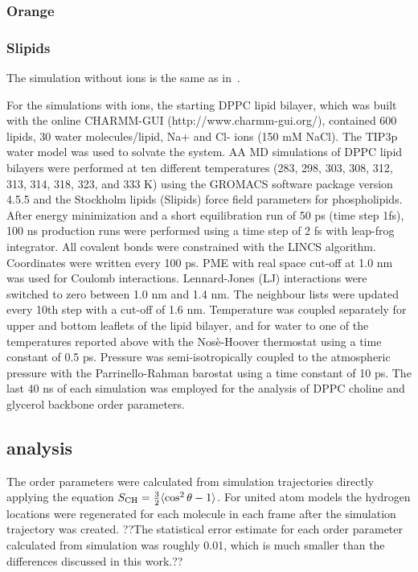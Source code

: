 \documentclass[pre,aps,floatfix,authordate1-4,twocolumn]{revtex4-1}
\begin{document}
\subsubsection{Orange}

\subsubsection{Slipids}
The simulation without ions is the same as in~\cite{botan15}.

For the simulations with ions, the starting DPPC lipid bilayer, which was built with the online CHARMM-GUI
(http://www.charmm-gui.org/), contained 600 lipids, 30 water molecules/lipid, Na+ and Cl- ions (150 mM NaCl). 
The TIP3p water model was used to solvate the system. AA MD simulations of DPPC lipid bilayers were performed 
at ten different temperatures (283, 298, 303, 308, 312, 313, 314, 318, 323, and 333 K) using the GROMACS software 
package version 4.5.5 and the Stockholm lipids (Slipids) force field parameters for phospholipids. After energy 
minimization and a short equilibration run of 50 ps (time step 1fs), 100 ns production runs were performed using 
a time step of 2 fs with leap-frog integrator. All covalent bonds were constrained with the LINCS
algorithm. Coordinates were written every 100 ps. PME with real space cut-off at 1.0 nm was used for Coulomb 
interactions. Lennard-Jones (LJ) interactions were switched to zero between 1.0 nm and 1.4 nm. The neighbour 
lists were updated every 10th step with a cut-off of 1.6 nm. Temperature was coupled separately for upper and 
bottom leaflets of the lipid bilayer, and for water to one of the temperatures reported above with the Nosè-Hoover 
thermostat using a time constant of 0.5 ps. Pressure was semi-isotropically coupled to the atmospheric pressure 
with the Parrinello-Rahman barostat using a time constant of 10 ps.
The last 40 ns of each simulation was employed for the analysis of DPPC choline and glycerol backbone order parameters.

\subsection{analysis}
The order parameters were calculated from simulation trajectories directly applying the equation
$S_{{\rm CH}}=\frac{3}{2} \langle \cos^2 \theta-1 \rangle$. For united atom models the hydrogen locations
were regenerated for each molecule in each frame after the simulation trajectory was created.
??The statistical error estimate for each order parameter calculated from simulation was roughly
0.01, which is much smaller than the differences discussed in this work.??
\end{document}
